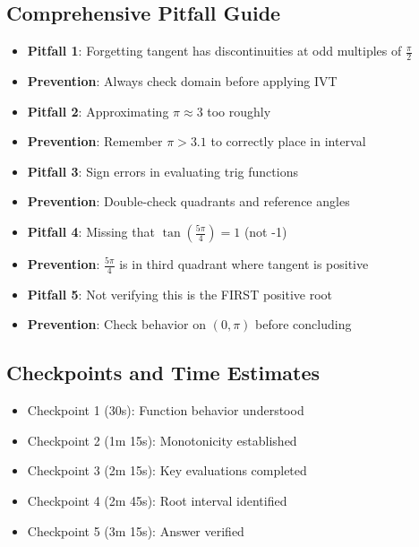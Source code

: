\documentclass[]{article}
\begin{document}
\begin{roadmapbox}
\subsection*{Comprehensive Pitfall Guide}
\begin{itemize}[leftmargin=*]
    \item \textbf{Pitfall 1}: Forgetting tangent has discontinuities at odd multiples of $\frac{\pi}{2}$
    \item \textbf{Prevention}: Always check domain before applying IVT
    
    \item \textbf{Pitfall 2}: Approximating $\pi \approx 3$ too roughly
    \item \textbf{Prevention}: Remember $\pi > 3.1$ to correctly place in interval
    
    \item \textbf{Pitfall 3}: Sign errors in evaluating trig functions
    \item \textbf{Prevention}: Double-check quadrants and reference angles
    
    \item \textbf{Pitfall 4}: Missing that $\tan(\frac{5\pi}{4}) = 1$ (not -1)
    \item \textbf{Prevention}: $\frac{5\pi}{4}$ is in third quadrant where tangent is positive
    
    \item \textbf{Pitfall 5}: Not verifying this is the FIRST positive root
    \item \textbf{Prevention}: Check behavior on $(0, \pi)$ before concluding
\end{itemize}

\subsection*{Checkpoints and Time Estimates}
\begin{itemize}[leftmargin=*]
    \item Checkpoint 1 (30s): Function behavior understood
    \item Checkpoint 2 (1m 15s): Monotonicity established
    \item Checkpoint 3 (2m 15s): Key evaluations completed
    \item Checkpoint 4 (2m 45s): Root interval identified
    \item Checkpoint 5 (3m 15s): Answer verified
\end{itemize}
\end{roadmapbox}
\end{document}
